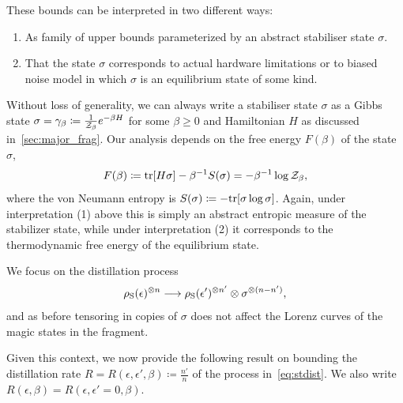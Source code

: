 \documentclass[pra,
aps,
twocolumn,
superscriptaddress,
groupedaddress,
nofootinbib,
reprint
]{revtex4-1}
\begin{document}
These bounds can be interpreted in two different ways: 
\begin{enumerate}
\item As family of upper bounds parameterized by an abstract stabiliser state $\sigma$.
\item That the state $\sigma$ corresponds to actual hardware limitations or to biased noise model in which $\sigma$ is an equilibrium state of some kind. 
\end{enumerate}
Without loss of generality, we can always write a stabiliser state $\sigma$ as a Gibbs state $\sigma = \gamma_\beta \coloneqq \frac{1}{\mathcal{Z}_\beta} e^{-\beta H}$ for some $\beta \geq 0$ and Hamiltonian $H$ as discussed in~\cref{sec:major_frag}. Our analysis depends on the free energy $F(\beta)$ of the state $\sigma$,
\begin{equation}
	F(\beta) \coloneqq {\rm{tr}}[H \sigma] - \beta^{-1}S(\sigma) = -\beta^{-1}\log{\mathcal{Z}_\beta},
\end{equation}
where the von Neumann entropy is $S(\sigma) \coloneqq -{\rm{tr}}[\sigma\log{\sigma}]$. Again, under interpretation (1) above this is simply an abstract entropic measure of the stabilizer state, while under interpretation (2) it corresponds to the thermodynamic free energy of the equilibrium state.

We focus on the distillation process
\begin{equation}\label{eq:stdist}
	\rho_{\rm{S}}(\epsilon)^{\otimes n} \longrightarrow \rho_{\rm{S}}(\epsilon')^{\otimes n'} \otimes \sigma^{\otimes (n-n')},
\end{equation}
and as before tensoring in copies of $\sigma$ does not affect the Lorenz curves of the magic states in the fragment.

Given this context, we now provide the following result on bounding the distillation rate $R = R(\epsilon, \epsilon', \beta) \coloneqq \frac{n'}{n}$ of the process in~\cref{eq:stdist}. 
We also write $R(\epsilon, \beta) = R(\epsilon, \epsilon'=0, \beta)$.
\end{document}
